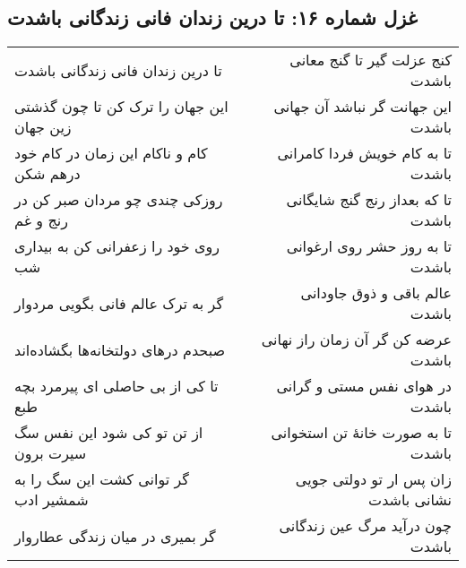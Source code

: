 \begin{center}
\section*{غزل شماره ۱۶: تا درین زندان فانی زندگانی باشدت}
\label{sec:016}
\begin{longtable}{l p{0.5cm} r}
تا درین زندان فانی زندگانی باشدت
&&
کنج عزلت گیر تا گنج معانی باشدت
\\
این جهان را ترک کن تا چون گذشتی زین جهان
&&
این جهانت گر نباشد آن جهانی باشدت
\\
کام و ناکام این زمان در کام خود درهم شکن
&&
تا به کام خویش فردا کامرانی باشدت
\\
روزکی چندی چو مردان صبر کن در رنج و غم
&&
تا که بعداز رنج گنج شایگانی باشدت
\\
روی خود را زعفرانی کن به بیداری شب
&&
تا به روز حشر روی ارغوانی باشدت
\\
گر به ترک عالم فانی بگویی مردوار
&&
عالم باقی و ذوق جاودانی باشدت
\\
صبحدم درهای دولتخانه‌ها بگشاده‌اند
&&
عرضه کن گر آن زمان راز نهانی باشدت
\\
تا کی از بی حاصلی ای پیرمرد بچه طبع
&&
در هوای نفس مستی و گرانی باشدت
\\
از تن تو کی شود این نفس سگ سیرت برون
&&
تا به صورت خانهٔ تن استخوانی باشدت
\\
گر توانی کشت این سگ را به شمشیر ادب
&&
زان پس ار تو دولتی جویی نشانی باشدت
\\
گر بمیری در میان زندگی عطاروار
&&
چون درآید مرگ عین زندگانی باشدت
\\
\end{longtable}
\end{center}
